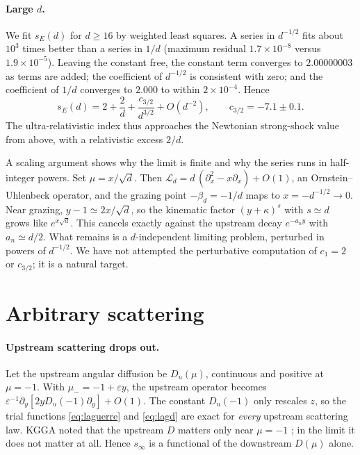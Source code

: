 \documentclass[aps,prd,twocolumn,superscriptaddress,nofootinbib,floatfix]{revtex4-2}
\newcommand{\sinf}{s_\infty}
\newcommand{\bd}{\beta_d}
\begin{document}
\paragraph{Large $d$.}
We fit $s_E(d)$ for $d\ge16$ by weighted least squares. A series in $d^{-1/2}$ fits about $10^3$ times better
than a series in $1/d$ (maximum residual $1.7\times10^{-8}$ versus $1.9\times10^{-5}$). Leaving the constant
free, the constant term converges to $2.00000003$ as terms are added; the coefficient of $d^{-1/2}$ is consistent
with zero; and the coefficient of $1/d$ converges to $2.000$ to within $2\times10^{-4}$. Hence
\begin{equation}
s_E(d)=2+\frac{2}{d}+\frac{c_{3/2}}{d^{3/2}}+O(d^{-2}),\qquad c_{3/2}=-7.1\pm0.1 .
\label{eq:larged}
\end{equation}
The ultra-relativistic index thus approaches the Newtonian strong-shock value from above, with a relativistic
excess $2/d$.

A scaling argument shows why the limit is finite and why the series runs in half-integer powers. Set
$\mu=x/\sqrt d$. Then $\mathcal{L}_d=d\,(\partial_x^2-x\partial_x)+O(1)$, an Ornstein--Uhlenbeck operator, and
the grazing point $-\bd=-1/d$ maps to $x=-d^{-1/2}\to0$. Near grazing, $y-1\simeq2x/\sqrt d$, so the kinematic
factor $(y+\kappa)^s$ with $s\simeq d$ grows like $e^{x\sqrt d}$. This cancels exactly against the upstream decay
$e^{-a_ny}$ with $a_n\simeq d/2$. What remains is a $d$-independent limiting problem, perturbed in powers of
$d^{-1/2}$. We have not attempted the perturbative computation of $c_1=2$ or $c_{3/2}$; it is a natural target.

\section{Arbitrary scattering}
\label{sec:scat}

\paragraph{Upstream scattering drops out.}
Let the upstream angular diffusion be $D_u(\mu)$, continuous and positive at $\mu=-1$. With
$\mu_-=-1+\varepsilon y$, the upstream operator becomes
$\varepsilon^{-1}\partial_y[2yD_u(-1)\partial_y]+O(1)$. The constant $D_u(-1)$ only rescales $z$, so the trial
functions \eqref{eq:laguerre} and \eqref{eq:lagd} are exact for \emph{every} upstream scattering law. KGGA noted
that the upstream $D$ matters only near $\mu=-1$ \cite{KGGA2000}; in the limit it does not matter at all.
Hence $\sinf$ is a functional of the downstream $D(\mu)$ alone.
\end{document}
